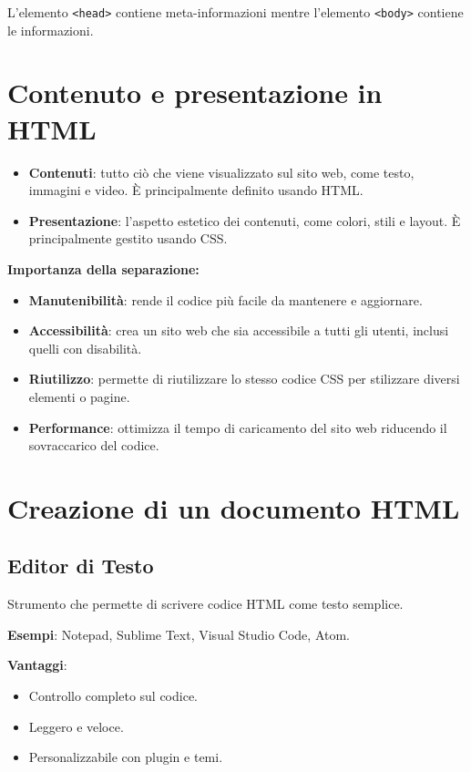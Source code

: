 L'elemento \texttt{<head>} contiene meta-informazioni mentre l'elemento \texttt{<body>} contiene le informazioni.

\section{Contenuto e presentazione in HTML}

\begin{itemize}
    \item \textbf{Contenuti}: tutto ciò che viene visualizzato sul sito web, come testo, immagini e video. È principalmente definito usando HTML.
    \item \textbf{Presentazione}: l'aspetto estetico dei contenuti, come colori, stili e layout. È principalmente gestito usando CSS.
\end{itemize}

\textbf{Importanza della separazione:}
\begin{itemize}
    \item \textbf{Manutenibilità}: rende il codice più facile da mantenere e aggiornare.
    \item \textbf{Accessibilità}: crea un sito web che sia accessibile a tutti gli utenti, inclusi quelli con disabilità.
    \item \textbf{Riutilizzo}: permette di riutilizzare lo stesso codice CSS per stilizzare diversi elementi o pagine.
    \item \textbf{Performance}: ottimizza il tempo di caricamento del sito web riducendo il sovraccarico del codice.
\end{itemize}

\section{Creazione di un documento HTML}

\subsection{Editor di Testo}

Strumento che permette di scrivere codice HTML come testo semplice.

\textbf{Esempi}: Notepad, Sublime Text, Visual Studio Code, Atom.

\textbf{Vantaggi}:
\begin{itemize}
    \item Controllo completo sul codice.
    \item Leggero e veloce.
    \item Personalizzabile con plugin e temi.
\end{itemize}


